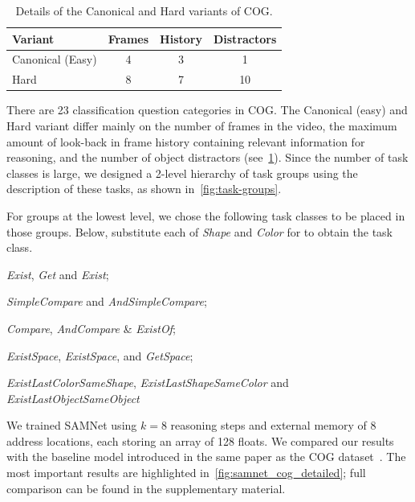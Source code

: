\begin{table}[ht]
	\centering
		\begin{tabular}{lccc}
			\toprule
			Variant	& Frames & History	& Distractors \\
			\midrule
			Canonical (Easy) & 4 & 3 & 1\\
			Hard  & 8 & 7 & 10\\
			\bottomrule
		\end{tabular}
	\caption{Details of the Canonical and Hard variants of COG.}
	\label{tab:cog_variants}
\end{table}\vspace{5pt}

There are 23 classification question categories in COG. The Canonical (easy) and Hard variant differ mainly on the number of frames in the video, the maximum amount of look-back in frame history containing relevant information for reasoning, and the number of object distractors (see~\cref{tab:cog_variants}). Since the number of task classes is large, we designed a 2-level hierarchy of task groups using the
description of these tasks, as shown in~\cref{fig:task-groups}.

For groups at the lowest level, we chose the following task classes to be placed in those groups.
Below, substitute each of \textit{Shape} and \textit{Color} for  \uX{} to obtain the task class.
\begin{description}
	\compresslist
	\item[Basic:] \textit{Exist}\uX, \textit{Get}\uX{} and \textit{Exist};
	\item[Obj-Attr:] \emph{SimpleCompare}\uX{} and \textit{AndSimpleCompare}\uX;
	\item[Compare:] \textit{Compare}\uX,  \textit{AndCompare}\uX{} \& \textit{Exist}\uX\textit{Of};
	\item[Spatial:] \textit{ExistSpace}, \textit{Exist}\uX\textit{Space}, and \textit{Get}\uX\textit{Space};
	\item[Cognitive:] \textit{ExistLastColorSameShape}, \textit{ExistLastShapeSameColor} and \textit{ExistLastObjectSameObject}
\end{description}


We trained SAMNet using $k = 8$ reasoning steps and external memory of 8 address locations, each storing an array of 128 floats. We compared our results with the baseline model introduced in the same paper as the COG dataset~\cite{yang2018dataset}.
The most important results are highlighted in~\cref{fig:samnet_cog_detailed}; full comparison can be found in the supplementary material.

